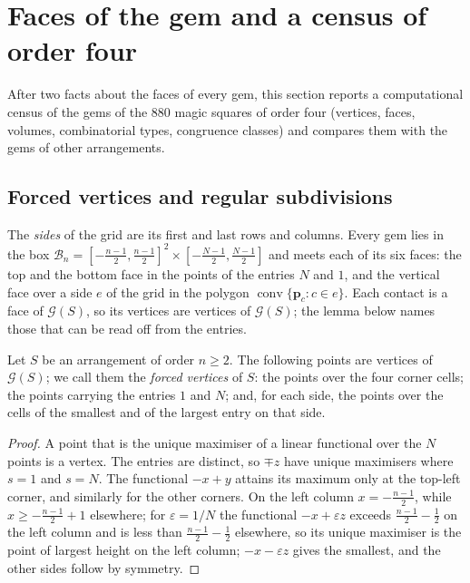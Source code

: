 \section{Faces of the gem and a census of order four}
\label{sec:census}

After two facts about the faces of every gem, this section reports a computational census of the gems of the $880$ magic squares of order four (vertices, faces, volumes, combinatorial types, congruence classes) and compares them with the gems of other arrangements.

\subsection{Forced vertices and regular subdivisions}
\label{sec:forced}

The \emph{sides} of the grid are its first and last rows and columns.
Every gem lies in the box $\mathcal B_n=[-\frac{n-1}2,\frac{n-1}2]^2\times[-\frac{N-1}2,\frac{N-1}2]$ and meets each of its six faces: the top and the bottom face in the points of the entries $N$ and $1$, and the vertical face over a side $e$ of the grid in the polygon $\operatorname{conv}\{\mathbf p_c: c\in e\}$.
Each contact is a face of $\mathcal G(S)$, so its vertices are vertices of $\mathcal G(S)$; the lemma below names those that can be read off from the entries.

\begin{lemma}
\label{lem:forced}
Let $S$ be an arrangement of order $n\ge2$. The following points are vertices of $\mathcal G(S)$; we call them the \emph{forced vertices} of $S$: the points over the four corner cells; the points carrying the entries $1$ and $N$; and, for each side, the points over the cells of the smallest and of the largest entry on that side.
\end{lemma}

\begin{proof}
A point that is the unique maximiser of a linear functional over the $N$ points is a vertex.
The entries are distinct, so $\mp z$ have unique maximisers where $s=1$ and $s=N$.
The functional $-x+y$ attains its maximum only at the top-left corner, and similarly for the other corners.
On the left column $x=-\frac{n-1}2$, while $x\ge-\frac{n-1}2+1$ elsewhere; for $\varepsilon=1/N$ the functional $-x+\varepsilon z$ exceeds $\frac{n-1}2-\frac12$ on the left column and is less than $\frac{n-1}2-\frac12$ elsewhere, so its unique maximiser is the point of largest height on the left column; $-x-\varepsilon z$ gives the smallest, and the other sides follow by symmetry.
\end{proof}

